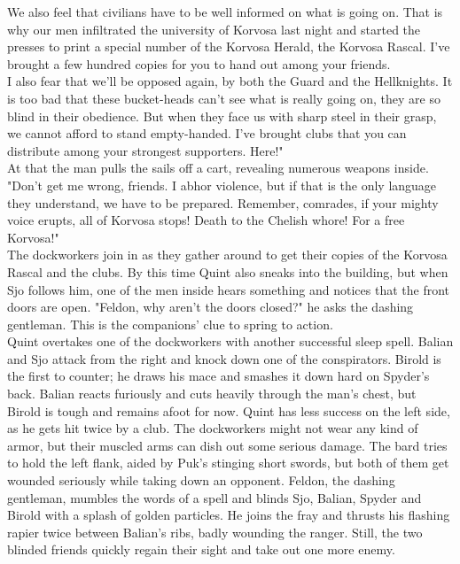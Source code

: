We also feel that civilians have to be well informed on what is going on. That is why our men infiltrated the university of Korvosa last night and started the presses to print a special number of the Korvosa Herald, the Korvosa Rascal. I've brought a few hundred copies for you to hand out among your friends.\\

I also fear that we'll be opposed again, by both the Guard and the Hellknights. It is too bad that these bucket-heads can't see what is really going on, they are so blind in their obedience. But when they face us with sharp steel in their grasp, we cannot afford to stand empty-handed. I've brought clubs that you can distribute among your strongest supporters. Here!"\\

At that the man pulls the sails off a cart, revealing numerous weapons inside. "Don't get me wrong, friends. I abhor violence, but if that is the only language they understand, we have to be prepared. Remember, comrades, if your mighty voice erupts, all of Korvosa stops! Death to the Chelish whore! For a free Korvosa!"\\

The dockworkers join in as they gather around to get their copies of the Korvosa Rascal and the clubs. By this time Quint also sneaks into the building, but when Sjo follows him, one of the men inside hears something and notices that the front doors are open. "Feldon, why aren't the doors closed?" he asks the dashing gentleman. This is the companions' clue to spring to action.\\

Quint overtakes one of the dockworkers with another successful sleep spell. Balian and Sjo attack from the right and knock down one of the conspirators. Birold is the first to counter; he draws his mace and smashes it down hard on Spyder's back. Balian reacts furiously and cuts heavily through the man's chest, but Birold is tough and remains afoot for now. Quint has less success on the left side, as he gets hit twice by a club. The dockworkers might not wear any kind of armor, but their muscled arms can dish out some serious damage. The bard tries to hold the left flank, aided by Puk's stinging short swords, but both of them get wounded seriously while taking down an opponent. Feldon, the dashing gentleman, mumbles the words of a spell and blinds Sjo, Balian, Spyder and Birold with a splash of golden particles. He joins the fray and thrusts his flashing rapier twice between Balian's ribs, badly wounding the ranger. Still, the two blinded friends quickly regain their sight and take out one more enemy.\\

